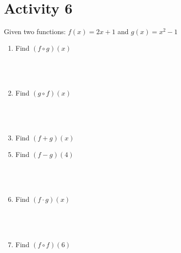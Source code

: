 \documentclass{article}
\begin{document}
\section*{Activity 6}
Given two functions: $f(x) = 2x+1$ and $g(x) = x^2 - 1$
\\
\begin{minipage}[t]{0.45\textwidth}
    \begin{enumerate}
        \item Find $(f \circ g)(x)$
        \\\\\\\\
        \item Find $(g \circ f)(x)$
        \\\\\\\\
        \item Find $(f + g)(x)$
    \end{enumerate}
\end{minipage}%
\hfill
\begin{minipage}[t]{0.45\textwidth}
    \begin{enumerate}
        \setcounter{enumi}{4} %
        \item Find $(f - g)(4)$
        \\\\\\\\
        \item Find $(f \cdot g)(x)$
        \\\\\\\\
        \item Find $(f \circ f)(6)$

    \end{enumerate}
\end{minipage}
\vspace{2cm}
\end{document}
